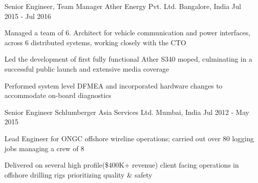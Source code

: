 \begin{cventries}
  \cventry
    {Senior Engineer, Team Manager} %
    {Ather Energy Pvt. Ltd.} %
    {Bangalore, India} %
    {Jul 2015 - Jul 2016} %
    {
      \begin{cvitems} %
        \item{Managed a team of 6. Architect for vehicle communication and power interfaces, across 6 distributed systems, working closely with the CTO}
        \item{Led the development of first fully functional Ather S340 moped, culminating in a successful public launch and extensive media coverage}
        \item {Performed system level DFMEA and incorporated hardware changes to accommodate on-board diagnostics}
      \end{cvitems}
    }

  \cventry
	{Senior Engineer} %
	{Schlumberger Asia Services Ltd.} %
	{Mumbai, India} %
	{Jul 2012 - May 2015} %
	{
		\begin{cvitems} %
			\item{Lead Engineer for ONGC offshore wireline operations; carried out over 80 logging jobs managing a crew of 8}
			\item {Delivered on several high profile(\$400K+ revenue) client facing operations in offshore drilling rigs prioritizing quality \& safety}
		\end{cvitems}
	}
\vspace{-4mm}

\end{cventries}
